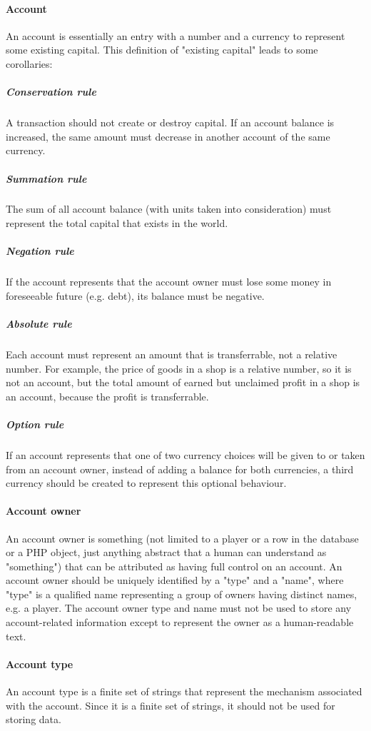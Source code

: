 \documentclass{report}
\begin{document}
			\paragraph{Account}
				An account is essentially an entry with a number and a currency to represent some existing capital. This definition of "existing capital" leads to some corollaries:
				\subparagraph{Conservation rule} A transaction should not create or destroy capital. If an account balance is increased, the same amount must decrease in another account of the same currency.
				\subparagraph{Summation rule} The sum of all account balance (with units taken into consideration) must represent the total capital that exists in the world.
				\subparagraph{Negation rule} If the account represents that the account owner must lose some money in foreseeable future (e.g. debt), its balance must be negative.
				\subparagraph{Absolute rule} Each account must represent an amount that is transferrable, not a relative number. For example, the price of goods in a shop is a relative number, so it is not an account, but the total amount of earned but unclaimed profit in a shop is an account, because the profit is transferrable.
				\subparagraph{Option rule} If an account represents that one of two currency choices will be given to or taken from an account owner, instead of adding a balance for both currencies, a third currency should be created to represent this optional behaviour.

			\paragraph{Account owner}
				An account owner is something (not limited to a player or a row in the database or a PHP object, just anything abstract that a human can understand as "something") that can be attributed as having full control on an account. An account owner should be uniquely identified by a "type" and a "name", where "type" is a qualified name representing a group of owners having distinct names, e.g. a player. The account owner type and name must not be used to store any account-related information except to represent the owner as a human-readable text.

			\paragraph{Account type}
				An account type is a finite set of strings that represent the mechanism associated with the account. Since it is a finite set of strings, it should not be used for storing data.
\end{document}
